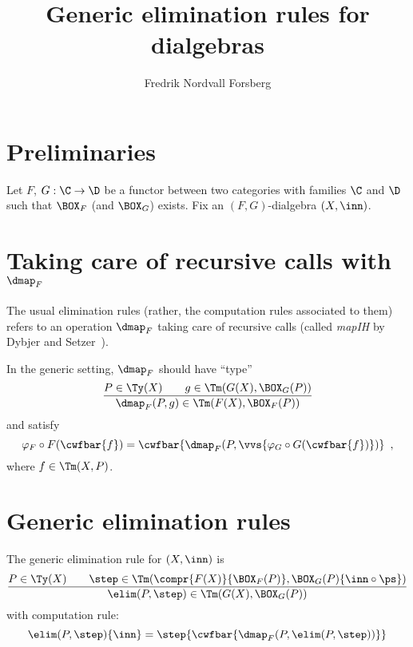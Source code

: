 \documentclass{article}
\title{Generic elimination rules for dialgebras}
\author{Fredrik Nordvall Forsberg}
\begin{document}
\maketitle

\section{Preliminaries}

Let $F$, $G : \C \to \D$ be a functor between two categories with
families $\C$ and $\D$ such that $\BOX_F$ (and $\BOX_G$) exists. Fix
an $(F,G)$-dialgebra $(X, \inn)$.

\section{Taking care of recursive calls with $\dmap_F$}

The usual elimination rules (rather, the computation rules associated
to them) refers to an operation $\dmap_F$ taking care of recursive
calls (called \textit{mapIH} by Dybjer and
Setzer~\cite{dybjersetzer1999finax}).

In the generic setting, $\dmap_F$ should have ``type''
\[
\frac{P \in \Ty(X) \qquad g \in \Tm(G(X), \BOX_G(P))}
     {\dmap_{F}(P, g) \in \Tm(F(X), \BOX_F(P))}
\]
and satisfy 
\[
\varphi_F \circ F(\cwfbar{f}) = \cwfbar{\dmap_F(P, \vvs\{\varphi_G \circ G(\cwfbar{f})\})} \enspace ,
\]
where $f \in \Tm(X, P)$.


\section{Generic elimination rules}
\label{sec:generic-elim}

The generic elimination rule for $(X, \inn)$ is
%
\begin{equation*}
\frac{P \in \Ty(X) \qquad \step \in \Tm(\compr{F(X)}{\BOX_F(P)}, \BOX_G(P)\{\inn \circ \ps\})}{\elim(P, \step) \in \Tm(G(X), \BOX_G(P))}
\label{eq:elim-general}
\end{equation*}
%
with computation rule:
%
\[
\elim(P, \step)\{\inn\} = \step\{ \cwfbar{\dmap_F(P, \elim(P, \step))} \}
\]
\end{document}
